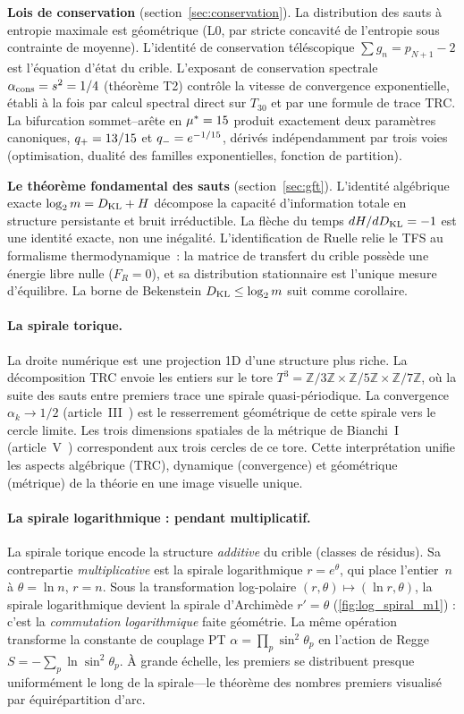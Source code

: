 \documentclass[12pt,a4paper]{article}
\begin{document}
\textbf{Lois de conservation} (section~\ref{sec:conservation}).
La distribution des sauts à entropie maximale est géométrique (L0,
par stricte concavité de l'entropie sous contrainte de moyenne).
L'identité de conservation téléscopique
$\sum g_n = p_{N+1} - 2$ est l'équation d'état du crible. L'exposant
de conservation spectrale $\alpha_{\rm cons} = s^2 = 1/4$ (théorème
T2) contrôle la vitesse de convergence exponentielle, établi à la
fois par calcul spectral direct sur $T_{30}$ et par une formule de
trace TRC. La bifurcation sommet--arête en ${\mu^{*}} = 15$ produit
exactement deux paramètres canoniques, $q_{+} = 13/15$ et
$q_{-} = e^{-1/15}$, dérivés indépendamment par trois voies
(optimisation, dualité des familles exponentielles, fonction de
partition).

\textbf{Le théorème fondamental des sauts} (section~\ref{sec:gft}).
L'identité algébrique exacte $\log_2 m = D_{\mathrm{KL}} + H$ décompose la
capacité d'information totale en structure persistante et bruit
irréductible. La flèche du temps $dH/dD_{\mathrm{KL}} = -1$ est une identité
exacte, non une inégalité. L'identification de Ruelle relie le TFS au
formalisme thermodynamique~: la matrice de transfert du crible
possède une énergie libre nulle ($F_R = 0$), et sa distribution
stationnaire est l'unique mesure d'équilibre. La borne de Bekenstein
$D_{\mathrm{KL}} \leq \log_2 m$ suit comme corollaire.

\paragraph{La spirale torique.}
La droite numérique est une projection 1D d'une structure plus riche.
La décomposition TRC envoie les entiers sur le tore
$T^3 = \mathbb{Z}/3\mathbb{Z} \times \mathbb{Z}/5\mathbb{Z} \times
\mathbb{Z}/7\mathbb{Z}$, où la suite des sauts entre premiers trace
une spirale quasi-périodique. La convergence $\alpha_k \to 1/2$
(article~III~\cite{companion_M3}) est le resserrement géométrique de
cette spirale vers le cercle limite. Les trois dimensions spatiales
de la métrique de Bianchi~I (article~V~\cite{companion_M5})
correspondent aux trois cercles de ce tore. Cette interprétation
unifie les aspects algébrique (TRC), dynamique (convergence) et
géométrique (métrique) de la théorie en une image visuelle unique.

\paragraph{La spirale logarithmique : pendant multiplicatif.}
La spirale torique encode la structure \emph{additive} du crible
(classes de résidus). Sa contrepartie \emph{multiplicative} est la
spirale logarithmique $r = e^{\theta}$, qui place l'entier~$n$ à
$\theta = \ln n$, $r = n$. Sous la transformation log-polaire
$(r, \theta) \mapsto (\ln r, \theta)$, la spirale logarithmique
devient la spirale d'Archimède $r' = \theta$
(\cref{fig:log_spiral_m1}) : c'est la \emph{commutation logarithmique}
faite géométrie. La même opération transforme la constante de couplage
PT $\alpha = \prod_p \sin^2 \theta_p$ en l'action de Regge
$S = -\sum_p \ln \sin^2 \theta_p$. À grande échelle, les premiers se
distribuent presque uniformément le long de la spirale---le théorème
des nombres premiers visualisé par équirépartition d'arc.
\end{document}
